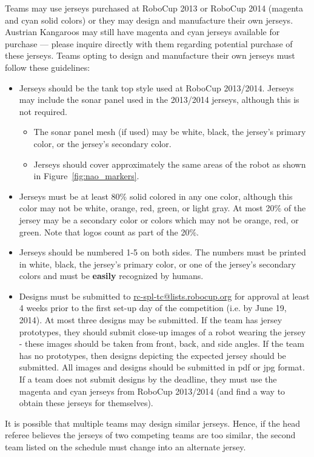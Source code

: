 \documentclass[12pt]{article}
\begin{document}
Teams may use jerseys purchased at RoboCup 2013 or RoboCup 2014 (magenta and cyan solid colors) or they may design and manufacture their own jerseys.  Austrian Kangaroos may still have magenta and cyan jerseys available for purchase --- please inquire directly with them regarding potential purchase of these jerseys.  Teams opting to design and manufacture their own jerseys must follow these guidelines:
\begin{itemize}
\item Jerseys should be the tank top style used at RoboCup 2013/2014.  Jerseys may include the sonar panel used in the 2013/2014 jerseys, although this is not required.
	\begin{itemize}
	\item The sonar panel mesh (if used) may be white, black, the jersey's primary color, or the jersey's secondary color.
	\item Jerseys should cover approximately the same areas of the robot as shown in Figure~\ref{fig:nao_markers}.
	\end{itemize}
\item Jerseys must be at least 80\% solid colored in any one color, although this color may not be white, orange, red, green, or light gray.  At most 20\% of the jersey may be a secondary color or colors which may not be orange, red, or green.  Note that logos count as part of the 20\%.
\item Jerseys should be numbered 1-5 on both sides.  The numbers must be printed in white, black, the jersey's primary color, or one of the jersey's secondary colors and must be {\bf easily} recognized by humans.
\item Designs must be submitted to \url{rc-spl-tc@lists.robocup.org} for approval at least 4 weeks prior to the first set-up day of the competition (i.e. by June 19, 2014). At most three designs may be submitted. If the team has jersey prototypes, they should submit close-up images of a robot wearing the jersey - these images should be taken from front, back, and side angles.  If the team has no prototypes, then designs depicting the expected jersey should be submitted.  All images and designs should be submitted in pdf or jpg format.  If a team does not submit designs by the deadline, they must use the magenta and cyan jerseys from RoboCup 2013/2014 (and find a way to obtain these jerseys for themselves).
\end{itemize}

It is possible that multiple teams may design similar jerseys.  Hence, if the head referee believes the jerseys of two competing teams are too similar, the second team listed on the schedule must change into an alternate jersey.
\end{document}
